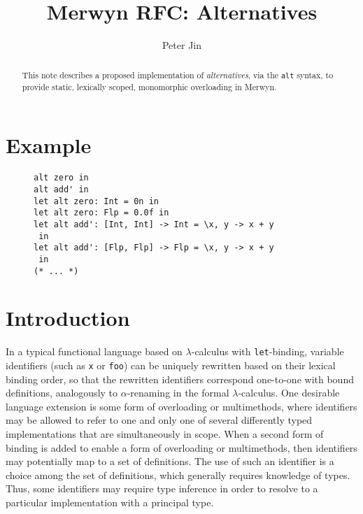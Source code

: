 \documentclass{article}
\title{Merwyn RFC: Alternatives}
\author{Peter Jin}
\renewcommand{\=}{\triangleq}
\begin{document}
\maketitle

\begin{abstract}
This note describes a proposed implementation of \emph{alternatives},
via the \texttt{alt} syntax, to provide static, lexically scoped, monomorphic
overloading in Merwyn.
\end{abstract}

\section{Example}

\begin{figure}[h]
\centering
\begin{varwidth}{\linewidth}
\begin{verbatim}
alt zero in
alt add' in
let alt zero: Int = 0n in
let alt zero: Flp = 0.0f in
let alt add': [Int, Int] -> Int = \x, y -> x + y
 in
let alt add': [Flp, Flp] -> Flp = \x, y -> x + y
 in
(* ... *)
\end{verbatim}
\end{varwidth}
\end{figure}

\section{Introduction}

In a typical functional language based on $\lambda$-calculus with
\texttt{let}-binding,
variable identifiers (such as \texttt{x} or \texttt{foo})
can be uniquely rewritten based on their lexical binding order,
so that the rewritten identifiers correspond one-to-one with bound definitions,
analogously to $\alpha$-renaming in the formal $\lambda$-calculus.
One desirable language extension is some form of overloading or multimethods,
where
identifiers may be allowed to refer to one and only one of several differently
typed implementations that are simultaneously in scope.
When a second form of binding is added to enable a form of overloading or
multimethods,
then identifiers may potentially map to a set of definitions.
The use of such an identifier is a choice among the set of definitions,
which generally requires knowledge of types.
Thus, some identifiers may require type inference in order to resolve to a
particular implementation with a principal type.
\end{document}
